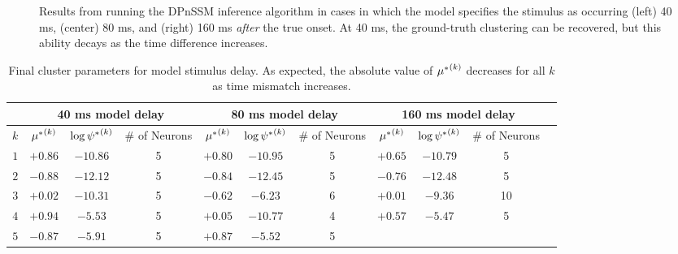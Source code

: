 \documentclass[twoside]{article}
\begin{document}
\begin{figure}[h]
\begin{center}
\end{center}
\caption{Results from running the DPnSSM inference algorithm in cases in which the model specifies the stimulus as occurring (left) 40 ms, (center) 80 ms, and (right) 160 ms \emph{after} the true onset.  At 40 ms, the ground-truth clustering can be recovered, but this ability decays as the time difference increases.} \label{overpredict}
\end{figure}

\begin{table}[h]
\vspace{-3mm}
\caption{Final cluster parameters for model stimulus delay.  As expected, the absolute value of ${\mu^*}^{(k)}_{}$ decreases for all $k$ as time mismatch increases.} \label{robust-table1}
\begin{center}
\begin{tabular}{c|ccc|ccc|cccl}
\multicolumn{1}{c}{} &\multicolumn{3}{c}{40 ms model delay} &\multicolumn{3}{c}{80 ms model delay} &\multicolumn{3}{c}{160 ms model delay} \\
\hline
$k$ & ${\mu^*}^{(k)}_{}$ & $\log {\psi^*}^{(k)}_{}$ &\# of Neurons & ${\mu^*}^{(k)}_{}$ & $\log {\psi^*}^{(k)}_{}$ &\# of Neurons & ${\mu^*}^{(k)}_{}$ & $\log {\psi^*}^{(k)}_{}$ &\# of Neurons \\
\hline
$1$ & $+0.86$ & $-10.86$ & 5 & $+0.80$ & $-10.95$ & 5 & $+0.65$ & $-10.79$ & 5  \\
$2$ &$-0.88$ & $-12.12$ & 5 & $-0.84$ & $-12.45$ & 5 & $-0.76$ & $-12.48$ & 5 \\
$3$ &$+0.02$ & $-10.31$  & 5 & $-0.62$ & $-6.23$ & 6 & $+0.01$ & $-9.36$ & 10 \\
$4$ &$+0.94$ & $-5.53$ & 5 & $+0.05$ & $-10.77$ & 4 & $+0.57$ & $-5.47$ & 5 \\
$5$ &$-0.87$ & $-5.91$ & 5& $+0.87$ & $-5.52$ & 5 
\end{tabular}
\vspace{-4mm}
\end{center}\end{table}   
\end{document}
